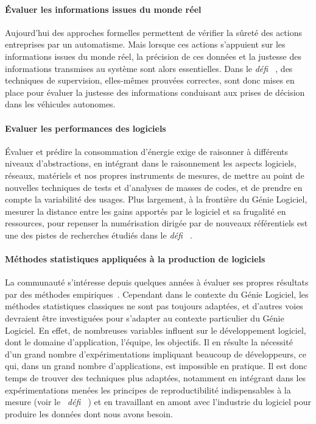 \documentclass[11pt]{article}
\newcommand{\GL}[0]{Génie Logiciel\xspace}
\newcommand{\defi}[1]{\emph{défi~%
\cite{#1}}}
\begin{document}
\paragraph{Évaluer les informations issues du monde réel}
Aujourd'hui des approches formelles permettent de vérifier la sûreté des actions entreprises par un automatisme. Mais lorsque ces actions s'appuient sur les informations issues du monde réel, la précision de ces données et la justesse des informations transmises au système sont alors essentielles. Dans le \defi{emergents}, 
des techniques de supervision,
elles-mêmes prouvées correctes, sont donc mises en place pour évaluer la justesse des informations conduisant aux prises de décision dans les véhicules autonomes.
 
 \paragraph{Evaluer les performances des logiciels}
Évaluer et prédire la consommation d'énergie  exige de raisonner à différents niveaux d'abstractions, en intégrant dans le raisonnement les aspects logiciels, réseaux, matériels et nos propres instruments de mesures, de mettre au point de nouvelles techniques de tests et d'analyses de masses de codes, et de prendre en compte la variabilité des usages. Plus largement, à la frontière du \GL,  mesurer la distance entre les gains apportés par le logiciel et sa frugalité en ressources, pour repenser la numérisation dirigée par de nouveaux référentiels est une des pistes de recherches étudiés dans le \defi{vert}.


\paragraph{Méthodes statistiques appliquées à la production de logiciels}
La communauté s'intéresse depuis quelques années à évaluer ses propres résultats par des méthodes empiriques~\cite{yu2019characterizing}. Cependant dans le contexte du \GL, les méthodes statistiques classiques ne sont pas toujours adaptées, et d'autres voies devraient être investiguées pour s'adapter au contexte particulier du \GL. En effet, de nombreuses variables influent sur le développement logiciel, dont le domaine d'application, l'équipe, les objectifs. Il en résulte la nécessité d'un grand nombre d'expérimentations impliquant beaucoup de développeurs, ce qui, dans un grand nombre d'applications, est impossible en pratique. Il est donc temps de trouver des techniques plus adaptées, notamment en intégrant dans les expérimentations menées les principes de reproductibilité indispensables à la mesure (voir le
~\defi{GLE}) et en travaillant en amont avec l'industrie du logiciel pour produire les données dont nous avons besoin.
\end{document}
